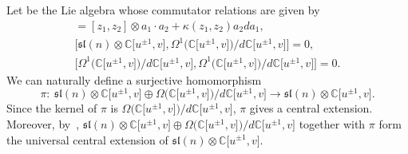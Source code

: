 \documentclass[10pt,a4paper]{amsart}
\numberwithin{equation}{section}
\theoremstyle{definition}
\begin{document}
Let  be the Lie algebra whose commutator relations are given by
\begin{gather*}
[z_1\otimes a_1,z_2\otimes a_2]=[z_1,z_2]\otimes a_1\cdot a_2+\kappa(z_1,z_2)a_2da_1,\\
\bigl[\mathfrak{sl}(n)\otimes\mathbb{C}\bigl[u^{\pm1},v\bigr],\Omega^1\bigl(\mathbb{C}\bigl[u^{\pm1},v\bigr]\bigr)/d\mathbb{C}\bigl[u^{\pm1},v\bigr]\bigr]=0,\\
\bigl[\Omega^1\bigl(\mathbb{C}\bigl[u^{\pm1},v\bigr]\bigr)/d\mathbb{C}\bigl[u^{\pm1},v\bigr],\Omega^1\bigl(\mathbb{C}\bigl[u^{\pm1},v\bigr]\bigr)/d\mathbb{C}\bigl[u^{\pm1},v\bigr]\bigr]=0.
\end{gather*}
We can naturally define a surjective homomorphism
\[
\pi\colon\ \mathfrak{sl}(n)\otimes\mathbb{C}\bigl[u^{\pm1},v\bigr]\oplus\Omega\bigl(\mathbb{C}\bigl[u^{\pm1},v\bigr]\bigr) / d\mathbb{C}\bigl[u^{\pm1},v\bigr]\to\mathfrak{sl}(n)\otimes\mathbb{C}\bigl[u^{\pm1},v\bigr].
\]
Since the kernel of $\pi$ is $\Omega\bigl(\mathbb{C}\bigl[u^{\pm1},v\bigr]\bigr)/d\mathbb{C}\bigl[u^{\pm1},v\bigr]$, $\pi$ gives a central extension.
Moreover, by~\cite{Kassel}, $\mathfrak{sl}(n)\otimes\mathbb{C}\bigl[u^{\pm1},v\bigr]\oplus\Omega \bigl(\mathbb{C}\bigl[u^{\pm1},v\bigr]\bigr)/d\mathbb{C}\bigl[u^{\pm1},v\bigr]$ together with $\pi$ form the universal central extension of $\mathfrak{sl}(n)\otimes\mathbb{C}\bigl[u^{\pm1},v\bigr]$.
\end{document}
